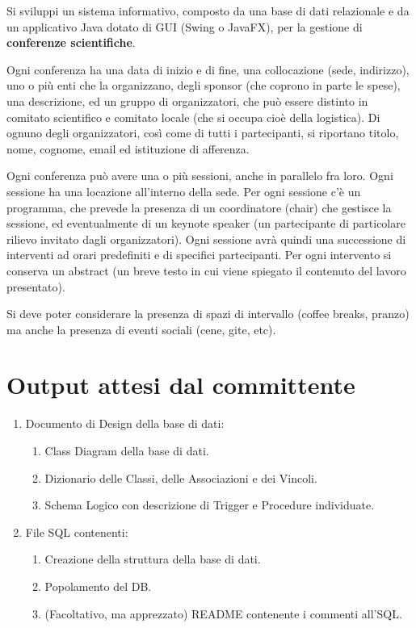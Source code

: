 Si sviluppi un sistema informativo, composto da una base di dati relazionale e da un applicativo Java dotato
di GUI (Swing o JavaFX), per la gestione di \textbf{conferenze scientifiche}. 
\bigskip

Ogni conferenza ha una data di inizio e di fine, una collocazione (sede, indirizzo), uno o più enti che la organizzano, degli sponsor (che coprono in parte le spese), una descrizione, ed un gruppo di organizzatori, che può essere distinto in comitato scientifico e comitato locale (che si occupa cioè della logistica). Di ognuno degli organizzatori, così come di tutti i partecipanti, si riportano titolo, nome, cognome, email ed istituzione di afferenza. 
\bigskip

Ogni conferenza può avere una o più sessioni, anche in parallelo fra loro. Ogni sessione ha una locazione all'interno della sede. Per ogni
sessione c'è un programma, che prevede la presenza di un coordinatore (chair) che gestisce la sessione, ed eventualmente di un keynote speaker (un partecipante di particolare rilievo invitato dagli organizzatori). Ogni sessione avrà quindi una successione di interventi ad orari predefiniti e di specifici partecipanti. Per ogni intervento si conserva un abstract (un breve testo in cui viene spiegato il contenuto del lavoro presentato).
\bigskip

Si deve poter considerare la presenza di spazi di intervallo (coffee breaks, pranzo) ma anche la presenza di eventi sociali (cene, gite, etc).
\section{Output attesi dal committente}
\begin{enumerate}
\item Documento di Design della base di dati:
\begin{enumerate}
\item Class Diagram della base di dati.
\item Dizionario delle Classi, delle Associazioni e dei Vincoli.
\item Schema Logico con descrizione di Trigger e Procedure individuate.
\end{enumerate}
\item File SQL contenenti:
\begin{enumerate}
\item Creazione della struttura della base di dati.
\item Popolamento del DB.
\item (Facoltativo, ma apprezzato) README contenente i commenti all’SQL.
\end{enumerate}
\end{enumerate}